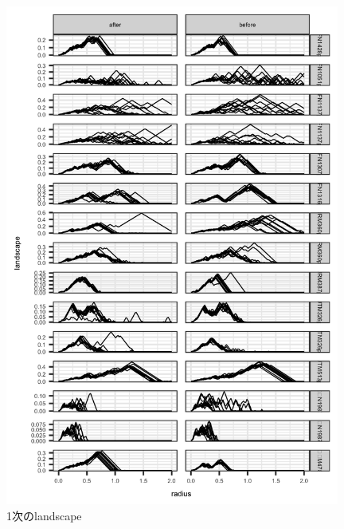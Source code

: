 \documentclass{jarticle}
\begin{document}
\begin{figure}[H]
\begin{center}
	\includegraphics[width=11cm]{fig/land_1.png}	
	\caption{1次のlandscape}\label{fig:land1}
\end{center}
\end{figure}
\end{document}
